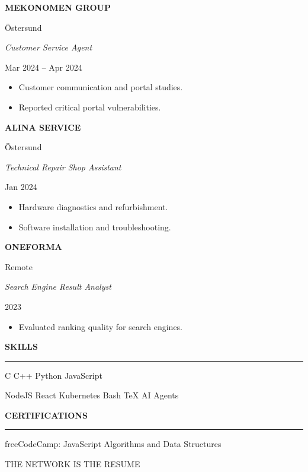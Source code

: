 \documentclass[10pt,a4paper]{article}
\newcommand{\psysection}[1]{
\vspace{0.5em}

{\Huge
\headfont
\bfseries
\textcolor{limeburn}{#1}}

\vspace{0.25em}

{\color{acidpink}
\rule{\linewidth}{1.5pt}}

\vspace{0.5em}
}
\newcommand{\job}[4]{
\vspace{0.7em}

{\Large\bfseries\color{sunburst} #1}

\hfill

{\color{neonblue} #2}

\vspace{0.15em}

{\itshape\color{acidpink} #3}

\hfill

{\color{limeburn} #4}

\vspace{0.25em}
}
\begin{document}
\job
{MEKONOMEN GROUP}
{Östersund}
{Customer Service Agent}
{Mar 2024 -- Apr 2024}

\begin{itemize}
\item Customer communication and portal studies.
\item Reported critical portal vulnerabilities.
\end{itemize}

\job
{ALINA SERVICE}
{Östersund}
{Technical Repair Shop Assistant}
{Jan 2024}
\begin{itemize}
\item Hardware diagnostics and refurbishment.
\item Software installation and troubleshooting.
\end{itemize}

\job
{ONEFORMA}
{Remote}
{Search Engine Result Analyst}
{2023}

\begin{itemize}
\item Evaluated ranking quality for search engines.
\end{itemize}


\psysection{SKILLS}

\begin{center}

{\Huge
\color{neonblue}
C
\quad
\color{acidpink}
C++
\quad
\color{limeburn}
Python
\quad
\color{sunburst}
JavaScript}

\vspace{0.5em}

{\Large
NodeJS
\quad
React
\quad
Kubernetes
\quad
Bash
\quad
TeX
\quad
AI Agents}

\end{center}


\psysection{CERTIFICATIONS}

{\Large
\color{violettrip}
freeCodeCamp:
JavaScript Algorithms and Data Structures}

\vfill

\begin{center}
{
\Huge
\headfont
THE NETWORK IS THE RESUME
}
\end{center}
\end{document}
